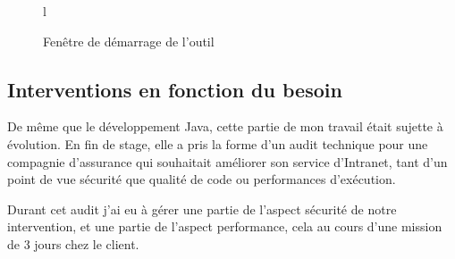 \begin{figure}{l}
	\caption{Fenêtre de démarrage de l'outil}
	\label{fig:accueil}
\end{figure}

\subsection{Interventions en fonction du besoin}
De même que le développement Java, cette partie de mon travail était sujette à évolution. En fin de stage, elle a pris la forme d'un audit technique pour une compagnie d'assurance qui souhaitait améliorer son service d'Intranet, tant d'un point de vue sécurité que qualité de code ou performances d'exécution.

Durant cet audit j'ai eu à gérer une partie de l'aspect sécurité de notre intervention, et une partie de l'aspect performance, cela au cours d'une mission de 3 jours chez le client.